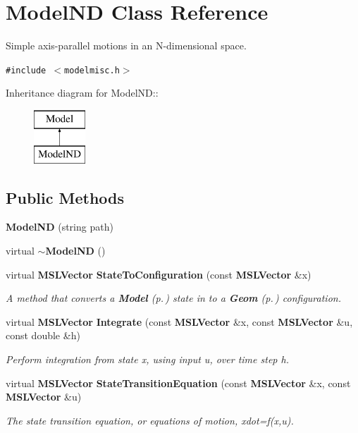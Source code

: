 \section{Model\-ND  Class Reference}
\label{class_ModelND}
Simple axis-parallel motions in an N-dimensional space. 


{\tt \#include $<$modelmisc.h$>$}

Inheritance diagram for Model\-ND::\begin{figure}[H]
\begin{center}
\leavevmode
\includegraphics[height=2cm]{class_ModelND}
\end{center}
\end{figure}
\subsection*{Public Methods}
\begin{CompactItemize}
\item 
{\bf Model\-ND} (string path)
\item 
virtual {\bf $\sim$Model\-ND} ()
\item 
virtual {\bf MSLVector} {\bf State\-To\-Configuration} (const {\bf MSLVector} \&x)
\begin{CompactList}\small\item\em A method that converts a {\bf Model} {\rm (p.\,\pageref{class_Model})} state in to a {\bf Geom} {\rm (p.\,\pageref{class_Geom})} configuration.\item\end{CompactList}\item 
virtual {\bf MSLVector} {\bf Integrate} (const {\bf MSLVector} \&x, const {\bf MSLVector} \&u, const double \&h)
\begin{CompactList}\small\item\em Perform integration from state x, using input u, over time step h.\item\end{CompactList}\item 
virtual {\bf MSLVector} {\bf State\-Transition\-Equation} (const {\bf MSLVector} \&x, const {\bf MSLVector} \&u)
\begin{CompactList}\small\item\em The state transition equation, or equations of motion, xdot=f(x,u).\item\end{CompactList}\end{CompactItemize}
